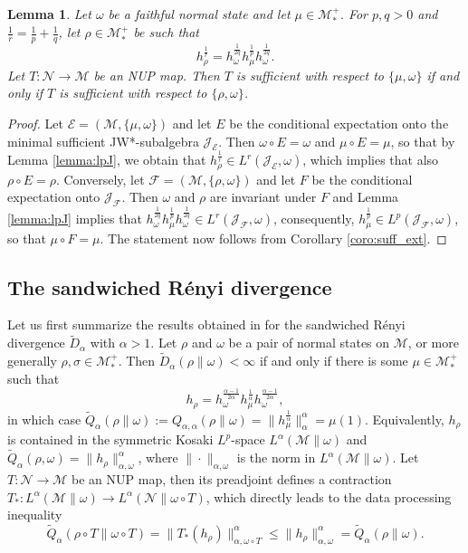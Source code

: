 \documentclass[12pt]{article}
\def\Ne{\mathcal N}
\def\Me{\mathcal M}
\def\Ee{\mathcal E}
\def\Fe{\mathcal F}
\def\Je{\mathcal J}
\newtheorem{lemma}{Lemma}
\theoremstyle{definition}
\theoremstyle{remark}
\begin{document}
\begin{lemma}\label{lemma:suff_alpha}
Let $\omega$ be a faithful normal state and let
$\mu\in \Me_*^+$. For $p,q>0$ and $\frac1r=\frac1p+\frac1q$, let $\rho\in \Me_*^+$ be such
that 
\[
h_{\rho}^{\frac1r}=h_{\omega}^{\frac1{2q}}h_\mu^{\frac1{p}}h_\omega^{\frac1{2q}}.
\]
 Let $T:\Ne\to \Me$ be an NUP map. Then  $T$
is sufficient with respect to $\{\mu,\omega\}$ if and only if $T$ is sufficient with respect to 
$\{\rho,\omega\}$.

\end{lemma}



\begin{proof} Let $\Ee=(\Me,\{\mu,\omega\})$ and let $E$ be the conditional expectation
onto the minimal sufficient JW*-subalgebra $\Je_{\Ee}$. Then $\omega\circ E=\omega$ and
$\mu\circ E=\mu$, so that by Lemma \ref{lemma:lpJ}, we obtain that $h_\rho^{\frac1r}\in
L^r(\Je_\Ee,\omega)$, which implies that also $\rho\circ E=\rho$. 
Conversely, let $\Fe=(\Me,\{\rho,\omega\})$ and let $F$ be the conditional expectation
onto $\Je_{\Fe}$. Then $\omega$ and $\rho$ are invariant under $F$ and Lemma \ref{lemma:lpJ}
implies that  $h_{\omega}^{\frac1{2q}}h_\mu^{\frac1{p}}h_\omega^{\frac1{2q}} \in
L^r(\Je_\Fe,\omega)$,  consequently, $h_\mu^{\frac1p}\in L^p(\Je_\Fe,\omega)$, so that
$\mu\circ F=\mu$. The statement now follows from Corollary \ref{coro:suff_ext}.

\end{proof}


\subsection{The sandwiched R\'enyi divergence}

Let us first summarize the results obtained in \cite{jencova2018renyi} for the  sandwiched R\'enyi divergence $\tilde D_\alpha$ with $\alpha>1$. Let
$\rho$ and $\omega$ be a pair of normal states on $\Me$, or more generally
$\rho,\sigma\in \Me_*^+$. Then $\tilde D_\alpha(\rho\|\omega)<\infty$ if and only if there
is some $\mu\in \Me_*^+$ such that
\[
h_\rho=h_\omega^{\frac{\alpha-1}{2\alpha}}h_\mu^{\frac1{\alpha}}h_\omega^{\frac{\alpha-1}{2\alpha}},
\]
in which case $\tilde
Q_\alpha(\rho\|\omega):=Q_{\alpha,\alpha}(\rho\|\omega)=\|h_\mu^{\frac1{\alpha}}\|_\alpha^\alpha=\mu(1)$.
Equivalently, $h_\rho$ is contained in the symmetric Kosaki $L^p$-space
$L^\alpha(\Me\|\omega)$
\cite{kosaki1984applications} and $\tilde
Q_\alpha(\rho,\omega)=\|h_\rho\|_{\alpha,\omega}^\alpha$, where
$\|\cdot\|_{\alpha,\omega}$ is the norm in $L^\alpha(\Me\|\omega)$. 
Let $T:\Ne\to \Me$ be an NUP map, then its preadjoint  defines a contraction
$T_*:L^\alpha(\Me\|\omega)\to L^\alpha(\Ne\|\omega\circ T)$, which directly leads to the data
processing inequality
\begin{equation}\label{eq:dpi_sandwiched}
\tilde Q_\alpha(\rho\circ T\|\omega\circ T)=\|T_*(h_\rho)\|^\alpha_{\alpha,\omega\circ T}\le
\|h_\rho\|^\alpha_{\alpha,\omega}=\tilde Q_\alpha(\rho\|\omega).
\end{equation}
\end{document}

